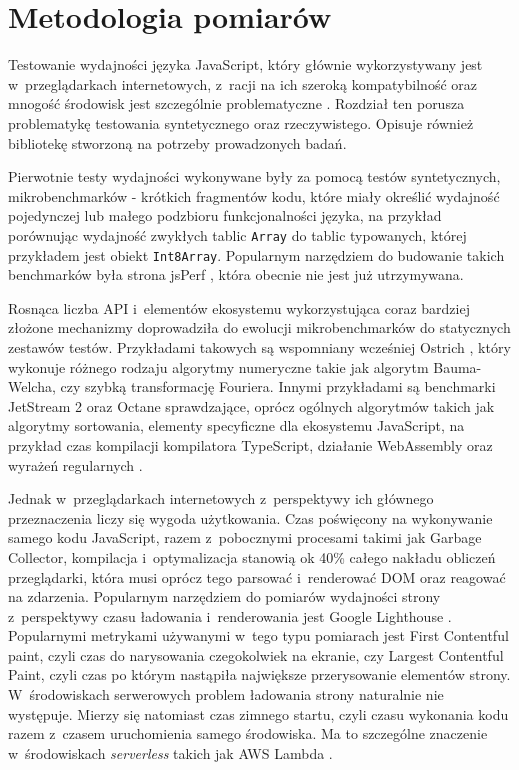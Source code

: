 \chapter{Metodologia pomiarów}

Testowanie wydajności języka JavaScript, który głównie wykorzystywany jest w~przeglądarkach internetowych, z~racji na ich szeroką kompatybilność oraz mnogość środowisk jest szczególnie problematyczne \cite{v8-real-perf}. Rozdział ten porusza problematykę testowania syntetycznego oraz rzeczywistego. Opisuje również bibliotekę stworzoną na potrzeby prowadzonych badań.

Pierwotnie testy wydajności wykonywane były za pomocą testów syntetycznych, mikrobenchmarków - krótkich fragmentów kodu, które miały określić wydajność pojedynczej lub małego podzbioru funkcjonalności języka, na przykład porównując wydajność zwykłych tablic \mbox{\lstinline{Array}} do tablic typowanych, której przykładem jest obiekt \lstinline{Int8Array}. Popularnym narzędziem do budowanie takich benchmarków była strona jsPerf \cite{jsperf}, która obecnie nie jest już utrzymywana.

Rosnąca liczba API i~elementów ekosystemu wykorzystująca coraz bardziej złożone mechanizmy doprowadziła do ewolucji mikrobenchmarków do statycznych zestawów testów. Przykładami takowych są wspomniany wcześniej Ostrich \cite{ostrich}, który wykonuje różnego rodzaju algorytmy numeryczne takie jak algorytm Bauma-Welcha, czy szybką transformację Fouriera. Innymi przykładami są benchmarki JetStream 2 oraz Octane sprawdzające, oprócz ogólnych algorytmów takich jak algorytmy sortowania, elementy specyficzne dla ekosystemu JavaScript, na przykład czas kompilacji kompilatora TypeScript, działanie WebAssembly oraz wyrażeń regularnych \cite{octane, jetstream}.

Jednak w~przeglądarkach internetowych z~perspektywy ich głównego przeznaczenia liczy się wygoda użytkowania. Czas poświęcony na wykonywanie samego kodu JavaScript, razem z~pobocznymi procesami takimi jak Garbage Collector, kompilacja i~optymalizacja stanowią ok 40\% całego nakładu obliczeń przeglądarki, która musi oprócz tego parsować i~renderować DOM oraz reagować na zdarzenia. Popularnym narzędziem do pomiarów wydajności strony z~perspektywy czasu ładowania i~renderowania jest Google Lighthouse \cite{lighthouse}. Popularnymi metrykami używanymi w~tego typu pomiarach jest First Contentful paint, czyli czas do narysowania czegokolwiek na ekranie, czy Largest Contentful Paint, czyli czas po którym nastąpiła największe przerysowanie elementów strony. W~środowiskach serwerowych problem ładowania strony naturalnie nie występuje. Mierzy się natomiast czas zimnego startu, czyli czasu wykonania kodu razem z~czasem uruchomienia samego środowiska. Ma to szczególne znaczenie w~środowiskach \textit{serverless} takich jak AWS Lambda \cite{aws-lambda}.

